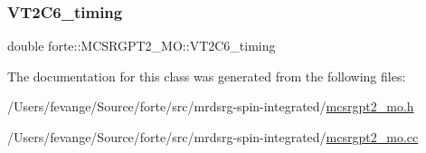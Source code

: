 \mbox{\label{classforte_1_1_m_c_s_r_g_p_t2___m_o_a1993b3dec813f7f3a24134f17393db84}} 
\subsubsection{\texorpdfstring{V\+T2\+C6\+\_\+timing}{VT2C6\_timing}}
{\footnotesize\ttfamily double forte\+::\+M\+C\+S\+R\+G\+P\+T2\+\_\+\+M\+O\+::\+V\+T2\+C6\+\_\+timing\hspace{0.3cm}{\ttfamily [protected]}}



The documentation for this class was generated from the following files\+:\begin{DoxyCompactItemize}
\item 
/\+Users/fevange/\+Source/forte/src/mrdsrg-\/spin-\/integrated/\mbox{\hyperlink{mcsrgpt2__mo_8h}{mcsrgpt2\+\_\+mo.\+h}}\item 
/\+Users/fevange/\+Source/forte/src/mrdsrg-\/spin-\/integrated/\mbox{\hyperlink{mcsrgpt2__mo_8cc}{mcsrgpt2\+\_\+mo.\+cc}}\end{DoxyCompactItemize}
